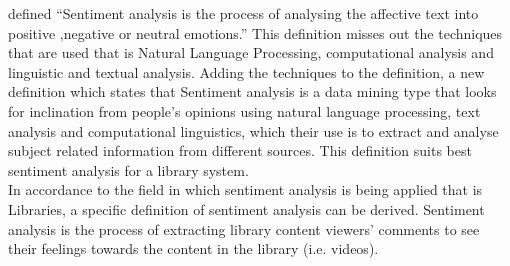 \documentclass[12pt]{report}
\begin{document}
 \cite{priyasentiment} defined “Sentiment analysis is the process of analysing the affective text into positive ,negative or neutral emotions.” This definition misses out the techniques that are used that is Natural Language Processing, computational analysis and linguistic and textual analysis. Adding the techniques to the definition, a new definition which states that Sentiment analysis is a data mining type that looks for inclination from people’s opinions using natural language processing, text analysis and computational linguistics, which their use is to extract and analyse subject related information from different sources. This definition suits best sentiment analysis for a library system.\\
 In accordance to the field in which sentiment analysis is being applied that is Libraries, a specific definition of sentiment analysis can be derived. Sentiment analysis is the process of extracting library content viewers’ comments to see their feelings towards the content in the library (i.e. videos). \\
 
\end{document}
